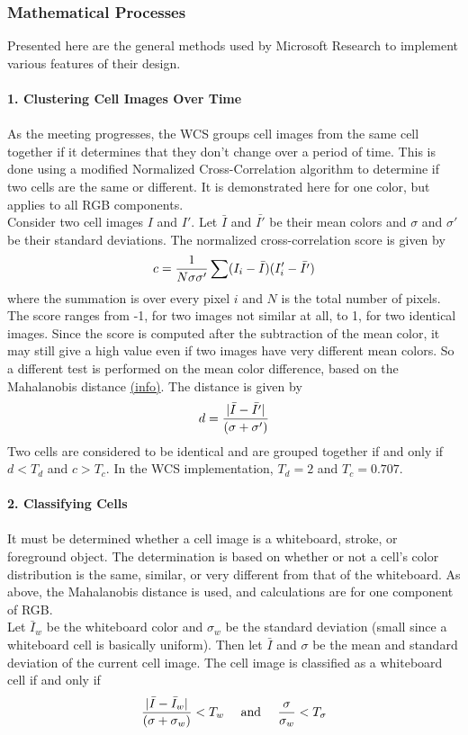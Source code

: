 \documentclass{article}
\begin{document}
	\subsubsection*{Mathematical Processes}
Presented here are the general methods used by Microsoft Research to implement various features of their design. \\ \\
	\textbf{1. Clustering Cell Images Over Time} \\  \\
As the meeting progresses, the WCS groups cell images from the same cell together if it determines that they don't change over a period of time.  This is done using a modified Normalized Cross-Correlation algorithm to determine if two cells are the same or different.  It is demonstrated here for one color, but applies to all RGB components.  \\
Consider two cell images $I$ and $I'$.  Let $\bar{I}$ and $\bar{I'}$ be their mean colors and $\sigma$ and $\sigma'$ be their standard deviations.  The normalized cross-correlation score is given by \[ c={1 \over N \sigma \sigma'} \sum (I_i - \bar{I})(I_i' - \bar{I'}) \]
where the summation is over every pixel $i$ and $N$ is the total number of pixels.  The score ranges from -1, for two images not similar at all, to 1, for two identical images.  Since the score is computed after the subtraction of the mean color, it may still give a high value even if two images have very different mean colors.  So a different test is performed on the mean color difference, based on the Mahalanobis distance \href{http://en.wikipedia.org/wiki/Mahalanobis_distance}{(info)}.  The distance is given by 
\[ d={|\bar{I}-\bar{I'}| \over (\sigma + \sigma')} \]
Two cells are considered to be identical and are grouped together if and only if $d<T_d$ and $c>T_c$.  In the WCS implementation, $T_d=2$ and $T_c=0.707$. \\ \\
	\textbf{2. Classifying Cells} \\ \\
It must be determined whether a cell image is a whiteboard, stroke, or foreground object.  The determination is based on whether or not a cell's color distribution is the same, similar, or very different from that of the whiteboard.  As above, the Mahalanobis distance is used, and calculations are for one component of RGB.  \\
\indent Let $\bar{I}_w$ be the whiteboard color and $\sigma_w$ be the standard deviation (small since a whiteboard cell is basically uniform).  Then let $\bar{I}$ and $\sigma$ be the mean and standard deviation of the current cell image.  The cell image is classified as a whiteboard cell if and only if \[ {|\bar{I} - \bar{I}_w| \over (\sigma + \sigma_w)}<T_w \quad \textrm{ and } \quad  {\sigma \over \sigma_w }< T_\sigma \] 
\end{document}
